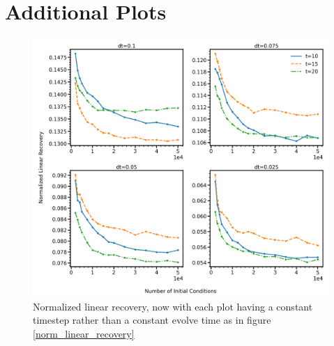 \documentclass[11pt]{article} %
\numberwithin{equation}{section}  %
\begin{document}
\newpage

\appendix

\section{Additional Plots}

\begin{figure}
	\centering
	
	\includegraphics[width=\linewidth]{figures/norm_linear_recovery_evolve_time}
	\caption{Normalized linear recovery, now with each plot having a constant timestep rather than a constant evolve time as in figure \ref{norm_linear_recovery}}\label{norm_linear_recovery_evolve_time}
\end{figure}
\end{document}
